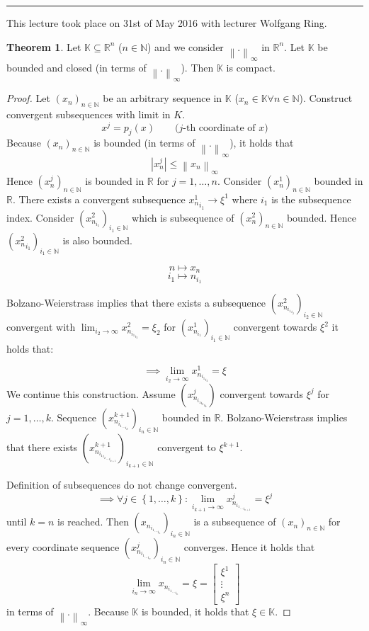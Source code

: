 \documentclass[a4paper,landscape,twocolumn]{article}
\theoremstyle{definition}
\newtheorem{theorem}{Theorem}
\newcommand\set[1]{\left\{#1\right\}}
\newcommand\abs[1]{\left|#1\right|}
\newcommand\meta[3]{\hrule{} This #1 took place on #2 with lecturer #3.\par}
\newcommand\inorm[1]{\left\|#1\right\|_\infty}
\begin{document}
\meta{lecture}{31st of May 2016}{Wolfgang Ring}

\begin{theorem}
  Let $\mathbb K \subseteq \mathbb R^n$ ($n \in \mathbb N$)
  and we consider $\inorm{.}$ in $\mathbb R^n$.
  Let $\mathbb K$ be bounded and closed (in terms of $\inorm{.}$).
  Then $\mathbb K$ is compact.
\end{theorem}
\begin{proof}
  Let $(x_n)_{n\in\mathbb N}$ be an arbitrary sequence in $\mathbb K$
  ($x_n \in \mathbb K \forall n \in \mathbb N$).
  Construct convergent subsequences with limit in $K$.
  \[ x^j = p_j(x) \qquad \text{($j$-th coordinate of $x$)} \]
  Because $(x_n)_{n\in\mathbb N}$ is bounded (in terms of $\inorm{.}$), it holds that
  \[ \abs{x_n^j} \leq \inorm{x_n} \]
  Hence $(x_n^j)_{n\in\mathbb N}$ is bounded in $\mathbb R$ for $j=1,\ldots,n$.
  Consider $(x_n^1)_{n\in\mathbb N}$ bounded in $\mathbb R$.
  There exists a convergent subsequence ${x_n^1}_{i_1} \to \xi^1$ where $i_1$ is
  the subsequence index. Consider $(x_{n_{i_1}}^2)_{i_1 \in \mathbb N}$ which is
  subsequence of $(x_n^2)_{n\in\mathbb N}$ bounded.
  Hence ${({x_n^2}_{i_1})}_{i_1 \in \mathbb N}$ is also bounded.

  \[ n \mapsto x_n \]
  \[ i_1 \mapsto n_{i_1} \]
  
  Bolzano-Weierstrass implies that there exists a subsequence $(x_{n_{{i_1}_{i_2}}}^2)_{i_2 \in \mathbb N}$ convergent with $\lim_{i_2 \to \infty} x^2_{n_{{i_1}_{i_2}}} = \xi_2$ for $(x^1_{n_{i_1}})_{i_1 \in \mathbb N}$ convergent towards $\xi^2$ it holds that:

  \[ \implies \lim_{i_2 \to \infty} x^1_{n_{{i_1}_{i_2}}} = \xi \]
  We continue this construction.
  Assume $(x^j_{n_{{{i_1}_{i_2}}_{i_k}}})$ convergent towards $\xi^j$ for $j = 1, \ldots, k$.
  Sequence $(x^{k+1}_{n_{{{i_1}_{\ldots}}_{i_k}}})_{i_n \in \mathbb N}$ bounded in $\mathbb R$.
  Bolzano-Weierstrass implies that there exists $(x^{k+1}_{n_{{{{i_1}_{i_2}}_{\ldots}}_{i_{k+1}}}})_{i_{k+1} \in \mathbb N}$ convergent to $\xi^{k+1}$.

  Definition of subsequences do not change convergent.
  \[ \implies \forall j \in \set{1, \ldots, k}: \lim_{i_{k+1}\to\infty} x^j_{n_{{{i_1}_{\ldots}}_{i_{n+1}}}} = \xi^j \]
  until $k=n$ is reached.
  Then $(x_{n_{{{i_1}_{\ldots}}_{i_n}}})_{i_n \in \mathbb N}$ is a subsequence of $(x_n)_{n\in\mathbb N}$ for every coordinate sequence $(x^j_{n_{{{i_1}_{\ldots}}_{i_n}}})_{i_n \in \mathbb N}$ converges.
  Hence it holds that
  \[ \lim_{i_n \to \infty} x_{n_{{{i_1}_{\ldots}}_{i_n}}} = \xi = \begin{bmatrix} \xi^1 \\ \vdots \\ \xi^n \end{bmatrix} \]
  in terms of $\inorm{.}$.
  Because $\mathbb K$ is bounded, it holds that $\xi \in \mathbb K$.
\end{proof}
\end{document}
